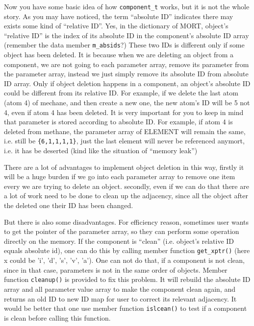 \documentclass[letterpaper]{book}
\begin{document}
  Now you have some basic idea of how \lstinline$component_t$ works, but it is not the whole story. As you may have
noticed, the term ``absolute ID'' indicates there may exists some kind of ``relative ID''. Yes, in the dictionary of
MORT, object's ``relative ID'' is the index of its absolute ID in the component's absolute ID array (remember the
data member \lstinline$m_absids$?) These two IDs is different only if some object has been deleted. It is because 
when we are deleting an object from a component, we are not going to each parameter array, remove its parameter 
from the parameter array, instead we just simply remove its absolute ID from absolute ID array. 
Only if object deletion happens in a component, an object's absolute ID could 
be different from its relative ID. For example, if we delete the last atom (atom 4) of mechane, and then create 
a new one, the
new atom's ID will be 5 not 4, even if atom 4 has been deleted. It is very important for you to keep in mind that 
parameter is stored according to absolute ID. For example, if atom 4 is deleted from methane, the parameter array of
ELEMENT will remain the same, i.e. still be \lstinline${6,1,1,1,1}$, just the last element will never be referenced 
anymort, i.e. it has be deserted (kind like the situation of ``memory leak'')

There are a lot of advantages to implement object deletion in this way, firstly it will be a huge burden if 
we go into each parameter
array to remove one item every we are trying to delete an object. secondly, even if we can do that there are a lot of
work need to be done to clean up the adjacency, since all the object after the deleted one their ID has been changed. 

But there is also some disadvantages. For efficiency reason, sometimes user wants to get 
the pointer of the parameter array,
so they can perform some operation directly on the memory. If the component is ``clean'' (i.e. object's relative ID equals
absolute id), one can do this by calling member function \lstinline$get_xptr()$ (here x could be 'i', 'd', 's', 'v', 'a').
One can not do that, if a component is not clean, since in that case, parameters is not 
in the same order of objects. Member
function \lstinline$cleanup()$ is provided to fix this problem. It will rebuild the absolute ID array and all parameter
value array to make the component clean again, and returns an old ID to new ID map for user to 
correct its relevant adjacency.
It would be better that one use member function \lstinline$islcean()$ to test if a component is clean before calling this
function.
\end{document}
